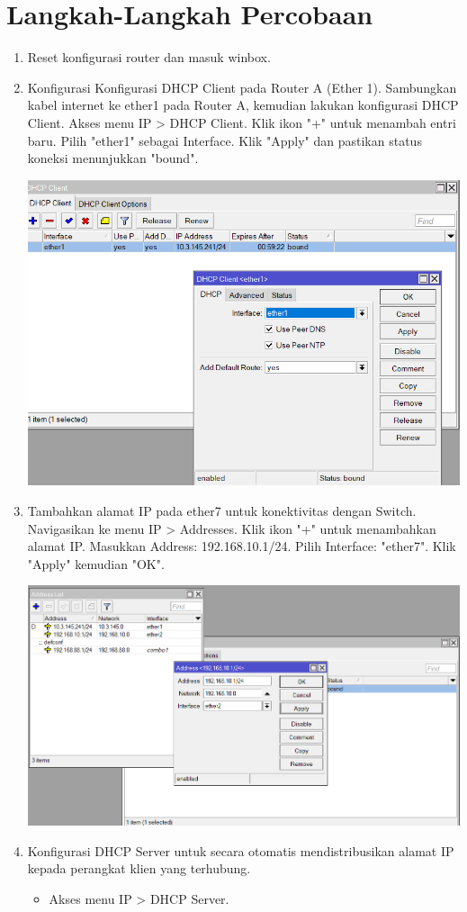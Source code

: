 \section{Langkah-Langkah Percobaan}
\begin{enumerate}
    \item Reset konfigurasi router dan masuk winbox.
    
    \item Konfigurasi Konfigurasi DHCP Client pada Router A (Ether 1). Sambungkan kabel internet ke ether1 pada Router A, kemudian lakukan konfigurasi DHCP Client. Akses menu IP > DHCP Client. Klik ikon "+" untuk menambah entri baru. Pilih "ether1" sebagai Interface. Klik "Apply" dan pastikan status koneksi menunjukkan "bound".
    
    \begin{center}
        \includegraphics[scale=0.5]{P1/img/1.png}
    \end{center}
    \item Tambahkan alamat IP pada ether7 untuk konektivitas dengan Switch. Navigasikan ke menu IP > Addresses. Klik ikon "+" untuk menambahkan alamat IP. Masukkan Address: 192.168.10.1/24. Pilih Interface: "ether7". Klik "Apply" kemudian "OK".
    \begin{center}
        \includegraphics[scale=0.5]{P1/img/2.png}
    \end{center}
    \item Konfigurasi DHCP Server untuk secara otomatis mendistribusikan alamat IP kepada perangkat klien yang terhubung.
    \begin{itemize}
        \item Akses menu IP > DHCP Server.


\end{itemize}
\end{enumerate}

